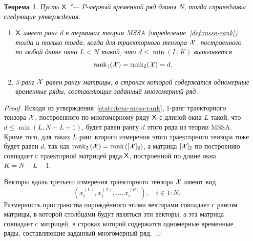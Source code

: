 \documentclass[specialist,
    substylefile = spbu.rtx,
    subf,href,colorlinks=true, 12pt]{disser}
\theoremstyle{plain}
\newtheorem{theorem}{Теорема}
\theoremstyle{definition}
\newtheorem{definition}{Определение}[section]
\theoremstyle{remark}
\begin{document}
    \begin{theorem}
        \label{state:hosvd-mssa-rang}
        Пусть $\mathsf{X}$ "--- $P$-мерный временной ряд длины $N$, тогда справедливы следующие утверждения.
        \begin{enumerate}
            \item $\mathsf{X}$ имеет ранг $d$ в терминах теории \emph{MSSA} (определение~\ref{def:mssa-rank})
            тогда и только тогда, когда для траекторного тензора $\mathcal{X}$, построенного по любой длине окна 
            $L<N$ такой, что $d \leqslant\min(L, K)$ выполняется 
            \[\operatorname{rank}_1(\mathcal{X}) = \operatorname{rank}_2(\mathcal{X}) = d.\]
            \item 3-ранг $\mathcal{X}$ равен рангу матрицы, 
            в строках которой содержатся одномерные временные ряды, составляющие заданный 
            многомерный ряд.
        \end{enumerate}
    \end{theorem}
    \begin{proof}
        Исходя из утверждения~\ref{state:tens-mssa-rank}, 1-ранг 
        траекторного тензора $\mathcal{X}$, построенного по многомерному ряду $\mathsf{X}$ с длиной окна
        $L$ такой, что $d \leqslant\min(L, N-L+1)$,
        будет равен рангу $d$ этого ряда из теории MSSA.
        Кроме того, для таких $L$ ранг второго измерения этого траекторного тензора
        тоже будет равен $d$, так как $\operatorname{rank}_2\left(\mathcal{X}\right) = 
        \operatorname{rank}\left([\mathcal{X}]_2\right)$,
        а матрица $[\mathcal{X}]_2$ по построению совпадает с траекторной матрицей ряда $\mathsf{X}$, построенной по длине
        окна $K = N - L - 1$.
        
        Векторы вдоль третьего измерения траекторного тензора $\mathcal{X}$ имеют вид
        \[
            \left(x_i^{(1)}, x_i^{(2)}, \ldots, x_i^{(P)}\right), \quad i \in \overline{1:N}.
        \]
        Размерность пространства порождённого этими векторами совпадает с рангом матрицы,
        в которой столбцами будут являться эти векторы, а эта матрица совпадает с матрицей, в строках которой содержатся одномерные временные ряды, составляющие заданный многомерный ряд.
    \end{proof}
\end{document}
